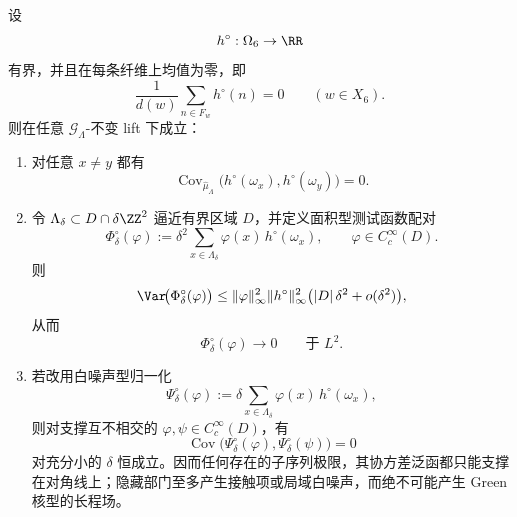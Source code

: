 \begin{theorem}[隐藏部门的严格局域性]\label{thm:xi-time-part9z-window6-hidden-sector-strict-locality}
设
\[
h^\circ:\Omega_6\to\RR
\]
有界，并且在每条纤维上均值为零，即
\[
\frac1{d(w)}\sum_{n\in F_w}h^\circ(n)=0
\qquad
(w\in X_6).
\]
则在任意 \(\mathcal G_\Lambda\)-不变 lift 下成立：
\begin{enumerate}
  \item 对任意 \(x\neq y\) 都有
  \[
  \operatorname{Cov}_{\widehat\mu_\Lambda}\!\bigl(h^\circ(\omega_x),h^\circ(\omega_y)\bigr)=0.
  \]
  \item 令 \(\Lambda_\delta\subset D\cap \delta\ZZ^2\) 逼近有界区域 \(D\)，并定义面积型测试函数配对
  \[
  \Phi_\delta^\circ(\varphi)
  :=
  \delta^2\sum_{x\in\Lambda_\delta}\varphi(x)\,h^\circ(\omega_x),
  \qquad
  \varphi\in C_c^\infty(D).
  \]
  则
  \[
  \Var\!\bigl(\Phi_\delta^\circ(\varphi)\bigr)
  \le
  \|\varphi\|_\infty^2\|h^\circ\|_\infty^2
  \bigl(|D|\,\delta^2+o(\delta^2)\bigr),
  \]
  从而
  \[
  \Phi_\delta^\circ(\varphi)\longrightarrow 0
  \qquad\text{于 }L^2.
  \]
  \item 若改用白噪声型归一化
  \[
  \Psi_\delta^\circ(\varphi)
  :=
  \delta\sum_{x\in\Lambda_\delta}\varphi(x)\,h^\circ(\omega_x),
  \]
  则对支撑互不相交的 \(\varphi,\psi\in C_c^\infty(D)\)，有
  \[
  \operatorname{Cov}\!\bigl(\Psi_\delta^\circ(\varphi),\Psi_\delta^\circ(\psi)\bigr)=0
  \]
  对充分小的 \(\delta\) 恒成立。因而任何存在的子序列极限，其协方差泛函都只能支撑在对角线上；隐藏部门至多产生接触项或局域白噪声，而绝不可能产生 Green 核型的长程场。
\end{enumerate}
\end{theorem}
